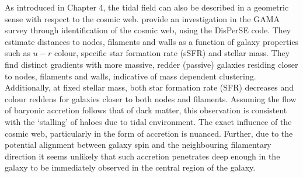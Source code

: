 As introduced in Chapter 4, the tidal field can also be described in a geometric sense with respect to the cosmic web. \citet{kraljic2018} provide an investigation in the GAMA survey through identification of the cosmic web, using the DisPerSE code. They estimate distances to nodes, filaments and walls as a function of galaxy properties such as $u - r$ colour, specific star formation rate (sSFR) and stellar mass. They find distinct gradients with more massive, redder (passive) galaxies residing closer to nodes, filaments and walls, indicative of mass dependent clustering. Additionally, at fixed stellar mass, both star formation rate (SFR) decreases and colour reddens for galaxies closer to both nodes and filaments. Assuming the flow of baryonic accretion follows that of dark matter, this observation is consistent with the `stalling' of haloes due to tidal environment. 
The exact influence of the cosmic web, particularly in the form of accretion is nuanced. Further, due to the potential alignment between galaxy spin and the neighbouring filamentary direction it seems unlikely that such accretion penetrates deep enough in the galaxy to be immediately observed in the central region of the galaxy. 


